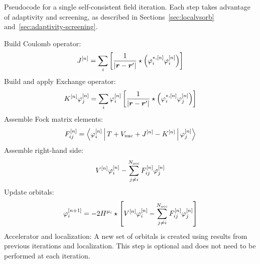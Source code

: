 \documentclass[journal=jctcce, manuscript=suppinfo]{achemso}
\begin{document}
\begin{algorithm*}
  \caption{Pseudocode for a single self-consistent field iteration. Each step takes advantage of adaptivity and screening, as described in Sections~\ref{sec:localvsorb} and~\ref{sec:adaptivity-screening}.} 
  \label{alg:SCF-iter}
  \begin{algorithmic}[1]
    
    \State Build Coulomb operator: $$J^{[n]} =
    \sum_i \left[\frac{1}{|\boldsymbol{r} - \boldsymbol{r}^\prime|} \star\left(\varphi_{i}^{*,[n]}\varphi_{i}^{[n]}\right)\right]$$
    \State Build and apply Exchange operator: $$K^{[n]}\varphi_{j}^{[n]} = \sum_i \varphi_{i}^{[n]} \left[\frac{1}{|\boldsymbol{r} - \boldsymbol{r}^\prime|} \star\left(\varphi_{i}^{*,[n]}\varphi_{j}^{[n]}\right)\right]$$
    \State Assemble Fock matrix elements: $$F_{ij}^{[n]} = \Braket{\varphi_{i}^{[n]} | T + V_{\mathrm{nuc}} + J^{[n]} - K^{[n]}| \varphi_{j}^{[n]}}$$
    \State Assemble right-hand side: $$V^{[n]}\varphi_{i}^{[n]} - \sum_{j\neq i}^{N_{\mathrm{occ}}}F_{ij}^{[n]}\varphi_{j}^{[n]}$$
    \State Update orbitals: $$\varphi_{i}^{[n+1]} = -2H^{\mu_{i}}\star\left[ V^{[n]}\varphi_{i}^{[n]} - \sum_{j\neq i}^{N_{\mathrm{occ}}}F_{ij}^{[n]}\varphi_{j}^{[n]}\right]$$
    \State Accelerator and localization: A new set of orbitals is created using results from previous iterations and localization. This step is optional and does not need to be performed at each iteration.
    \EndProcedure
  \end{algorithmic}
\end{algorithm*}
\end{document}
